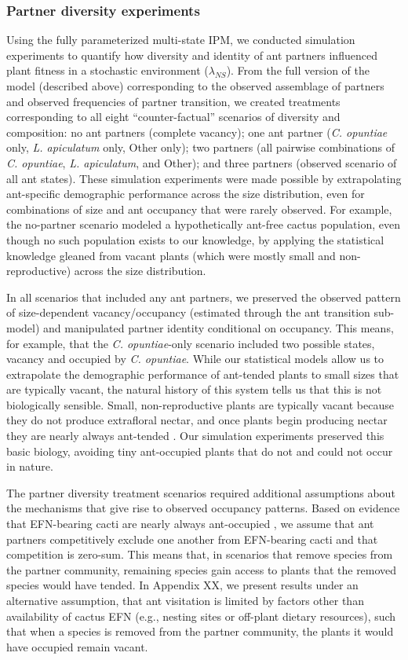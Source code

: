 \documentclass[11pt]{article}
\begin{document}
\subsubsection*{Partner diversity experiments}
Using the fully parameterized multi-state IPM, we conducted simulation experiments to quantify how diversity and identity of ant partners influenced plant fitness in a stochastic environment ($\lambda_{NS}$). 
From the full version of the model (described above) corresponding to the observed assemblage of partners and observed frequencies of partner transition, we created treatments corresponding to all eight ``counter-factual'' scenarios of diversity and composition: no ant partners (complete vacancy); one ant partner (\textit{C. opuntiae} only, \textit{L. apiculatum} only, Other only); two partners (all pairwise combinations of \textit{C. opuntiae}, \textit{L. apiculatum}, and Other); and three partners (observed scenario of all ant states).
These simulation experiments were made possible by extrapolating ant-specific demographic performance across the size distribution, even for combinations of size and ant occupancy that were rarely observed. 
For example, the no-partner scenario modeled a hypothetically ant-free cactus population, even though no such population exists to our knowledge, by applying the statistical knowledge gleaned from vacant plants (which were mostly small and non-reproductive) across the size distribution. 

In all scenarios that included any ant partners, we preserved the observed pattern of size-dependent vacancy/occupancy (estimated through the ant transition sub-model) and manipulated partner identity conditional on occupancy. 
This means, for example, that the \textit{C. opuntiae}-only scenario included two possible states, vacancy and occupied by \textit{C. opuntiae}. 
While our statistical models allow us to extrapolate the demographic performance of ant-tended plants to small sizes that are typically vacant, the natural history of this system tells us that this is not biologically sensible. 
Small, non-reproductive plants are typically vacant because they do not produce extrafloral nectar, and once plants begin producing nectar they are nearly always ant-tended \citep{Miller2014}. 
Our simulation experiments preserved this basic biology, avoiding tiny ant-occupied plants that do not and could not occur in nature. 

The partner diversity treatment scenarios required additional assumptions about the mechanisms that give rise to observed occupancy patterns. 
Based on evidence that EFN-bearing cacti are nearly always ant-occupied \citep{Miller2014}, we assume that ant partners competitively exclude one another from EFN-bearing cacti and that competition is zero-sum. 
This means that, in scenarios that remove species from the partner community, remaining species gain access to plants that the removed species would have tended. 
In Appendix XX, we present results under an alternative assumption, that ant visitation is limited by factors other than availability of cactus EFN (e.g., nesting sites or off-plant dietary resources), such that when a species is removed from the partner community, the plants it would have occupied remain vacant. 
\end{document}
